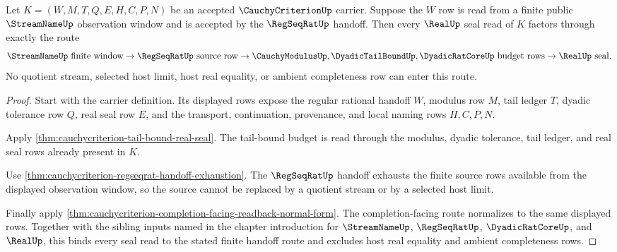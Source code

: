 \begin{theorem}
\label{thm:cauchycriterion-regseqrat-streamname-realup-handoff}
Let $K=(W,M,T,Q,E,H,C,P,N)$ be an accepted $\CauchyCriterionUp$
carrier. Suppose the $W$ row is read from a finite public
$\StreamNameUp$ observation window and is accepted by the $\RegSeqRatUp$
handoff. Then every $\RealUp$ seal read of $K$ factors through exactly the
route
$$
\StreamNameUp\text{ finite window}
\to
\RegSeqRatUp\text{ source row}
\to
\CauchyModulusUp,\DyadicTailBoundUp,\DyadicRatCoreUp\text{ budget rows}
\to
\RealUp\text{ seal}.
$$
No quotient stream, selected host limit, host real equality, or ambient
completeness row can enter this route.
\end{theorem}
\begin{proof}
Start with the carrier definition. Its displayed rows expose the regular
rational handoff $W$, modulus row $M$, tail ledger $T$, dyadic tolerance
row $Q$, real seal row $E$, and the transport, continuation, provenance,
and local naming rows $H,C,P,N$.

Apply \autoref{thm:cauchycriterion-tail-bound-real-seal}. The tail-bound
budget is read through the modulus, dyadic tolerance, tail ledger, and
real seal rows already present in $K$.

Use \autoref{thm:cauchycriterion-regseqrat-handoff-exhaustion}. The
$\RegSeqRatUp$ handoff exhausts the finite source rows available from the
displayed observation window, so the source cannot be replaced by a
quotient stream or by a selected host limit.

Finally apply
\autoref{thm:cauchycriterion-completion-facing-readback-normal-form}. The
completion-facing route normalizes to the same displayed rows. Together
with the sibling inputs named in the chapter introduction for
$\StreamNameUp$, $\RegSeqRatUp$, $\DyadicRatCoreUp$, and $\RealUp$, this
binds every seal read to the stated finite handoff route and excludes host
real equality and ambient completeness rows.
\end{proof}

